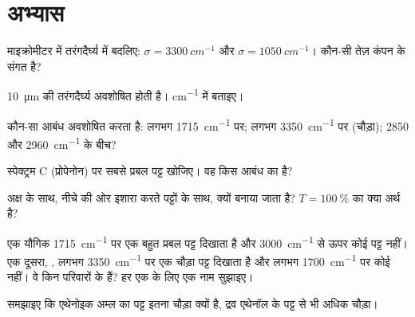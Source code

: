 \section{अभ्यास}

\begin{exercise}[$\star$]\label{exo:g11:infrared:1}
माइक्रोमीटर में तरंगदैर्घ्य में बदलिए: $\sigma = \qty{3300}{cm^{-1}}$
और $\sigma = \qty{1050}{cm^{-1}}$। कौन-सी तेज़ कंपन के
संगत है?
\end{exercise}

\begin{exercise}[$\star$]\label{exo:g11:infrared:2}
\qty{10}{\micro m} की तरंगदैर्घ्य अवशोषित होती है। 
\si{cm^{-1}} में बताइए।
\end{exercise}

\begin{exercise}[$\star$]\label{exo:g11:infrared:3}
कौन-सा आबंध अवशोषित करता है: लगभग \qty{1715}{cm^{-1}} पर; लगभग \qty{3350}{cm^{-1}}
पर (चौड़ा); 2850 और \qty{2960}{cm^{-1}} के बीच?
\end{exercise}

\begin{exercise}[$\star$]\label{exo:g11:infrared:4}
स्पेक्ट्रम C (प्रोपेनोन) पर सबसे प्रबल पट्ट खोजिए। वह किस आबंध
का है?
\end{exercise}

\begin{exercise}[$\star$]\label{exo:g11:infrared:5}
  अक्ष के साथ, नीचे की ओर इशारा करते पट्टों के साथ, क्यों
बनाया जाता है? $T = \qty{100}{\percent}$ का क्या अर्थ है?
\end{exercise}

\begin{exercise}[$\star\star$]\label{exo:g11:infrared:6}
एक यौगिक  \qty{1715}{cm^{-1}} पर एक बहुत प्रबल पट्ट
दिखाता है और \qty{3000}{cm^{-1}} से ऊपर कोई पट्ट नहीं। एक दूसरा,
, लगभग \qty{3350}{cm^{-1}} पर एक चौड़ा पट्ट दिखाता है और लगभग
\qty{1700}{cm^{-1}} पर कोई नहीं। वे किन परिवारों के हैं? हर एक के लिए एक नाम
सुझाइए।
\end{exercise}

\begin{exercise}[$\star\star$]\label{exo:g11:infrared:7}
समझाइए कि एथेनोइक अम्ल का  पट्ट इतना चौड़ा क्यों है, द्रव एथेनॉल
के पट्ट से भी अधिक चौड़ा।
\end{exercise}

